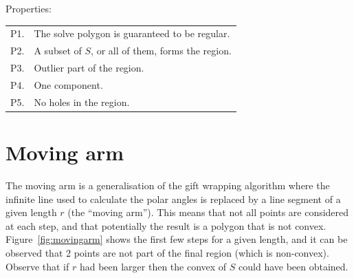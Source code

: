 %
Properties:
\\
\begin{tabular}{@{}ll@{}}
\toprule
P1. & The solve polygon is guaranteed to be regular.  \\  
P2. & A subset of $S$, or all of them, forms the region. \\ 
P3. & Outlier part of the region. \\ 
P4. & One component.  \\ 
P5. & No holes in the region.  \\  
\bottomrule
\end{tabular}



%
\section{Moving arm}

The moving arm is a generalisation of the gift wrapping algorithm where the infinite line used to calculate the polar angles is replaced by a line segment of a given length $r$ (the ``moving arm'').
This means that not all points are considered at each step, and that potentially the result is a polygon that is not convex.
Figure~\ref{fig:movingarm} shows the first few steps for a given length, and it can be observed that 2 points are not part of the final region (which is non-convex).
Observe that if $r$ had been larger then the convex of $S$ could have been obtained.

